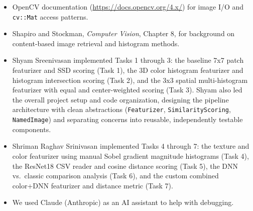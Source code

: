 \documentclass[11pt,letterpaper]{article}
\begin{document}
\begin{itemize}
    \item OpenCV documentation (\url{https://docs.opencv.org/4.x/}) for image
        I/O and \texttt{cv::Mat} access patterns.
    \item Shapiro and Stockman, \emph{Computer Vision}, Chapter 8, for
        background on content-based image retrieval and histogram methods.
    \item Shyam Sreenivasan implemented Tasks 1 through 3: the baseline 7x7
        patch featurizer and SSD scoring (Task 1), the 3D color histogram
        featurizer and histogram intersection scoring (Task 2), and the 3x3
        spatial multi-histogram featurizer with equal and center-weighted
        scoring (Task 3). Shyam also led the overall project setup and code
        organization, designing the pipeline architecture with clean
        abstractions (\texttt{Featurizer}, \texttt{SimilarityScoring},
        \texttt{NamedImage}) and separating concerns into reusable,
        independently testable components.
    \item Shriman Raghav Srinivasan implemented Tasks 4 through 7: the texture
        and color featurizer using manual Sobel gradient magnitude histograms
        (Task 4), the ResNet18 CSV reader and cosine distance scoring (Task 5),
        the DNN vs.\ classic comparison analysis (Task 6), and the custom
        combined color+DNN featurizer and distance metric (Task 7).
    \item We used Claude (Anthropic) as an AI assistant to help with
        debugging.
\end{itemize}
\end{document}
